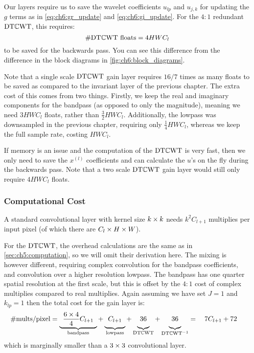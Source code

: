 Our layers require us to save the wavelet coefficients $u_{lp}$ and $u_{j,k}$
for updating the $g$ terms as in \eqref{eq:ch6:gr_update} and \eqref{eq:ch6:gi_update}.  
For the $4:1$ redundant $\mathrm{DT}\mathbb{C}\mathrm{WT}$, this requires:
%
\begin{equation}
  \text{\#$\mathrm{DT}\mathbb{C}\mathrm{WT}$ floats} = 4HWC_l 
\end{equation}
%
to be saved for the backwards pass.  You can see this difference from the
difference in the block diagrams in \autoref{fig:ch6:block_diagrams}.

Note that a single scale $\mathrm{DT}\mathbb{C}\mathrm{WT}$ gain layer requires $16/7$ times as many
floats to be saved as compared to the invariant layer of the previous chapter.
The extra cost of this comes from two things. Firstly, we keep the real and
imaginary components for the bandpass (as opposed to only the magnitude),
meaning we need $3HWC_l$ floats, rather than $\frac{3}{2}HWC_l$. Additionally,
the lowpass was downsampled in the previous chapter, requiring only
$\frac{1}{4}HWC_l$, whereas we keep the full sample rate, costing $HWC_l$.

If memory is an issue and the computation of the $\mathrm{DT}\mathbb{C}\mathrm{WT}$ is very fast, then we
only need to save the $x^{(l)}$ coefficients and can calculate the $u$'s on the
fly during the backwards pass. Note that a two scale $\mathrm{DT}\mathbb{C}\mathrm{WT}$ gain layer would
still only require $4HWC_l$ floats.

\subsubsection{Computational Cost}\label{sec:ch6:computation}
A standard convolutional layer with kernel size $k\times k$ needs $k^2C_{l+1}$
multiplies per input pixel (of which there are $C_{l}\times H\times W$).

For the $\mathrm{DT}\mathbb{C}\mathrm{WT}$, the overhead calculations are the same as in
\autoref{sec:ch5:computation}, so we will omit their derivation here. The mixing
is however different, requiring complex convolution for the bandpass
coefficients, and convolution over a higher resolution lowpass. The bandpass has
one quarter spatial resolution at the first scale, but this is offset by the
$4:1$ cost of complex multiplies compared to real multiplies. Again assuming we
have set $J=1$ and $k_{lp} = 1$ then the total cost for the gain layer is:
%
\begin{equation}
  \text{\#mults/pixel} = \underbrace{\hphantom{1} \frac{6\x 4}{4}C_{l+1} \hphantom{1}}_{\textrm{bandpass}} +
  \underbrace{\hphantom{1}\vphantom{\frac{6}{4}} C_{l+1} \hphantom{1}}_{\textrm{lowpass}} + 
  \underbrace{\vphantom{\frac{6}{4}} 36}_{\DTCWT} + 
  \underbrace{\vphantom{\frac{6}{4}} 36}_{\DTCWT^{-1}} = \quad 7C_{l+1} + 72 \quad
  \label{eq:ch6:comp_dtcwt}
\end{equation}
which is marginally smaller than a $3\times 3$ convolutional layer.

